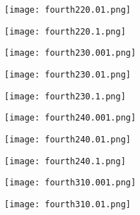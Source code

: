 \documentclass[12pt]{article}
\begin{document}
\begin{figure}[H]

	\centering
	\begin{minipage}{.5\textwidth}
		\centering
		\texttt{[image: fourth220.01.png]}
	\end{minipage}%
	\begin{minipage}{.5\textwidth}
		\centering
		\texttt{[image: fourth220.1.png]}
	\end{minipage}
\end{figure}



\begin{figure}[H]

	\centering
	\begin{minipage}{.5\textwidth}
		\centering
		\texttt{[image: fourth230.001.png]}
	\end{minipage}%
	\begin{minipage}{.5\textwidth}
		\centering
		\texttt{[image: fourth230.01.png]}
	\end{minipage}
\end{figure}

\begin{figure}[H]

	\centering
	\begin{minipage}{.5\textwidth}
		\centering
		\texttt{[image: fourth230.1.png]}
	\end{minipage}%
	\begin{minipage}{.5\textwidth}
		\centering
		\texttt{[image: fourth240.001.png]}
	\end{minipage}
\end{figure}

\begin{figure}[H]

	\centering
	\begin{minipage}{.5\textwidth}
		\centering
		\texttt{[image: fourth240.01.png]}
	\end{minipage}%
	\begin{minipage}{.5\textwidth}
		\centering
		\texttt{[image: fourth240.1.png]}
	\end{minipage}
\end{figure}



\begin{figure}[H]

	\centering
	\begin{minipage}{.5\textwidth}
		\centering
		\texttt{[image: fourth310.001.png]}
	\end{minipage}%
	\begin{minipage}{.5\textwidth}
		\centering
		\texttt{[image: fourth310.01.png]}
	\end{minipage}
\end{figure}
\end{document}
